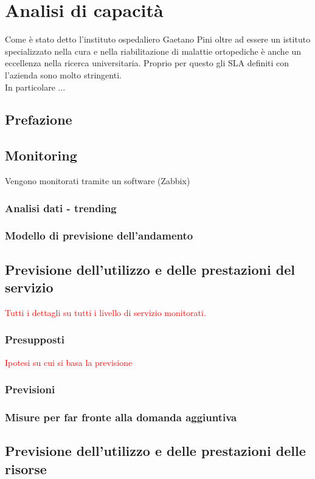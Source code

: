 \newpage
\section{Analisi di capacità} \label{ref:capacita}
Come è stato detto l'instituto ospedaliero Gaetano Pini oltre ad essere un istituto specializzato nella cura e nella riabilitazione di malattie ortopediche è anche un eccellenza nella ricerca universitaria.
Proprio per questo gli SLA definiti con l'azienda sono molto stringenti. \\
In particolare ...

\subsection{Prefazione}
		\subsection{Monitoring}
		Vengono monitorati tramite un software (Zabbix)
		\subsubsection{Analisi dati - trending}
		\subsubsection{Modello di previsione dell'andamento}

\subsection{Previsione dell'utilizzo e delle prestazioni del servizio}
	\textcolor{red}{Tutti i dettagli su tutti i livello di servizio monitorati.}
	
	\subsubsection{Presupposti}
	\textcolor{red}{Ipotesi su cui si basa la previsione }
	\subsubsection{Previsioni}
	\textcolor{red}{}
	\subsubsection{Misure per far fronte alla domanda aggiuntiva}
	
	
\subsection{Previsione dell'utilizzo e delle prestazioni delle risorse}
